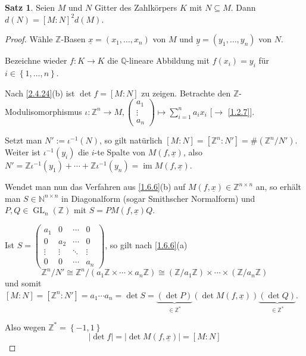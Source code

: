 \documentclass[
twoside=semi,
fontsize=12,
DIV=12, 
cleardoublepage=current,
leqno,
headings=optiontoheadandtoc, 
toc=idx
]{scrbook}
\newcommand{\N}{\mathbb{N}}
\newcommand{\Z}{\mathbb{Z}}
\newcommand{\Q}{\mathbb{Q}}
\newcommand{\set}[1]{\left\{ #1 \right\}}
\DeclareMathOperator{\im}{im}
\DeclareMathOperator{\GL}{GL}
\theoremstyle{definition}
\newtheorem{satz}[definition]{Satz}
\begin{document}
	\begin{satz}\label{3.1.7}\hfill\newline
		Seien $M$ und $N$ Gitter des Zahlk\"orpers $K$ mit $N \subseteq M$. Dann $d(N) = [M:N]^2 d(M)$.
		
		\begin{proof}
			W\"ahle $\Z$-Basen $\underline{x} = (x_1, \dots, x_n)$ von $M$ und $\underline{y} = (y_1, \dots, y_n)$ von $N$.
			
			Bezeichne wieder $f:K\to K$ die $\Q$-lineare Abbildung mit $f(x_i) = y_i$ f\"ur \linebreak $i \in \set{1, \dots, n}$.
			
			Nach \ref{2.4.24}(b) ist $\det f = [M:N]$ zu zeigen. Betrachte den $\Z$-Modulisomorphismus $\iota : \Z^n \to M, \begin{pmatrix}
				a_1\\ \vdots \\ a_n
			\end{pmatrix} \mapsto \sum_{i=1}^{n} a_ix_i$ [$\to$ \ref{1.2.7}].
		
			Setzt man $N' := \iota^{-1} (N)$, so gilt nat\"urlich $[M:N] = [\Z^n:N'] = \#(\Z^n/N')$. Weiter ist $\iota^{-1}(y_i)$
			die $i$-te Spalte von $M(f, \underline{x})$, also $N' = \Z\iota^{-1}(y_1) + \cdots + \Z\iota^{-1}(y_n) = \im M(f, \underline{x})$.
			
			Wendet man nun das Verfahren aus \ref{1.6.6}(b) auf $M(f, \underline{x}) \in \Z^{n \times n}$ an, so erh\"alt man $S \in \N^{n\times n}$ in Diagonalform (sogar 
			Smithscher Normalform) und $P, Q \in \GL_n(\Z)$ mit $S = PM(f, \underline{x})Q$.
			
			Ist $S = \begin{pmatrix}
				a_1 & 0 & \cdots & 0\\
				0 & a_2 & \cdots & 0\\
				\vdots & \vdots & \ddots & \vdots\\
				0 & 0 & \cdots & a_n
			\end{pmatrix}$, so gilt nach \ref{1.6.6}(a) 
			\[\Z^n/N' \cong \Z^n / (a_1\Z \times \cdots \times a_n \Z) \cong (\Z/a_1\Z) \times \cdots \times (\Z/a_n\Z)\]
			und somit $[M:N] = [\Z^n:N'] = a_1 \cdots a_n = \det S = \underbrace{(\det P)}_{\in \Z^*} (\det M(f, \underline{x})) \underbrace{(\det Q)}_{\in \Z^*}$.
			
			Also wegen $\Z^* = \set{-1, 1}$ 
				\[|\det f| = |\det M(f, \underline{x})| = [M:N]\]
 		\end{proof}
	\end{satz}
\end{document}
